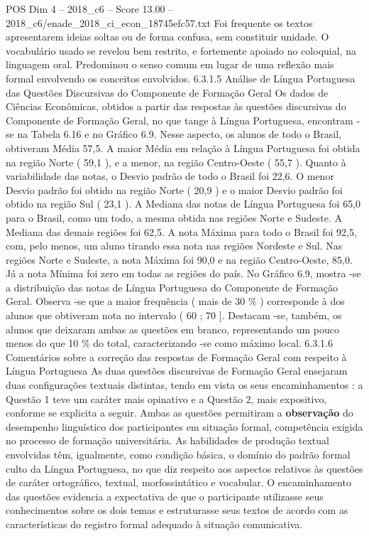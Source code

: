\begin{textsample}{POS Dim 4 – 2018\_c6 – Score 13.00 – 2018\_c6/enade\_2018\_ci\_econ\_18745efc57.txt}
Foi frequente os textos apresentarem ideias soltas ou de forma confusa, sem constituir unidade.
O vocabulário usado se revelou bem restrito, e fortemente apoiado no coloquial, na linguagem oral.
Predominou o senso comum em lugar de uma reflexão mais formal envolvendo os conceitos envolvidos. 6.3.1.5 Análise de Língua Portuguesa das Questões Discursivas do Componente de Formação Geral Os dados de Ciências Econômicas, obtidos a partir das respostas às questões discursivas do Componente de Formação Geral, no que tange à Língua Portuguesa, encontram -se na Tabela 6.16 e no Gráfico 6.9.
Nesse aspecto, os alunos de todo o Brasil, obtiveram Média 57,5.
A maior Média em relação à Língua Portuguesa foi obtida na região Norte ( 59,1 ), e a menor, na região Centro-Oeste ( 55,7 ).
Quanto à variabilidade das notas, o Desvio padrão de todo o Brasil foi 22,6.
O menor Desvio padrão foi obtido na região Norte ( 20,9 ) e o maior Desvio padrão foi obtido na região Sul ( 23,1 ).
A Mediana das notas de Língua Portuguesa foi 65,0 para o Brasil, como um todo, a mesma obtida nas regiões Norte e Sudeste.
A Mediana das demais regiões foi 62,5.
A nota Máxima para todo o Brasil foi 92,5, com, pelo menos, um aluno tirando essa nota nas regiões Nordeste e Sul.
Nas regiões Norte e Sudeste, a nota Máxima foi 90,0 e na região Centro-Oeste, 85,0.
Já a nota Mínima foi zero em todas as regiões do país.
No Gráfico 6.9, mostra -se a distribuição das notas de Língua Portuguesa do Componente de Formação Geral.
Observa -se que a maior frequência ( mais de 30 \% ) corresponde à dos alunos que obtiveram nota no intervalo ( 60 ; 70 ].
Destacam -se, também, os alunos que deixaram ambas as questões em branco, representando um pouco menos do que 10 \% do total, caracterizando -se como máximo local. 6.3.1.6 Comentários sobre a correção das respostas de Formação Geral com respeito à Língua Portuguesa As duas questões discursivas de Formação Geral ensejaram duas configurações textuais distintas, tendo em vista os seus encaminhamentos : a Questão 1 teve um caráter mais opinativo e a Questão 2, mais expositivo, conforme se explicita a seguir.
Ambas as questões permitiram a \textbf{observação} do desempenho linguístico dos participantes em situação formal, competência exigida no processo de formação universitária.
As habilidades de produção textual envolvidas têm, igualmente, como condição básica, o domínio do padrão formal culto da Língua Portuguesa, no que diz respeito aos aspectos relativos às questões de caráter ortográfico, textual, morfossintático e vocabular.
O encaminhamento das questões evidencia a expectativa de que o participante utilizasse seus conhecimentos sobre os dois temas e estruturasse seus textos de acordo com as características do registro formal adequado à situação comunicativa.

\end{textsample}
